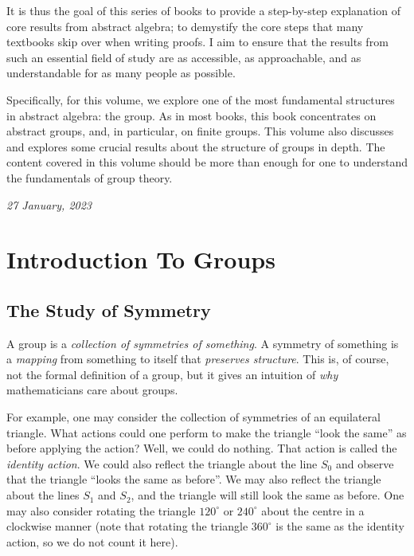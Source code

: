 It is thus the goal of this series of books to provide a step-by-step explanation of core results from abstract algebra; to demystify the core steps that many textbooks skip over when writing proofs. I aim to ensure that the results from such an essential field of study are as accessible, as approachable, and as understandable for as many people as possible.

Specifically, for this volume, we explore one of the most fundamental structures in abstract algebra: the group. As in most books, this book concentrates on abstract groups, and, in particular, on finite groups. This volume also discusses and explores some crucial results about the structure of groups in depth. The content covered in this volume should be more than enough for one to understand the fundamentals of group theory.

\hfill{\textit{27 January, 2023}}

\mainmatter  %
\chapter{Introduction To Groups}
\section{The Study of Symmetry}
A group is a \textit{collection of symmetries of something}. A symmetry of something is a \textit{mapping} from something to itself that \textit{preserves structure}. This is, of course, not the formal definition of a group, but it gives an intuition of \textit{why} mathematicians care about groups.

\begin{figure}
    \centering
\end{figure}

For example, one may consider the collection of symmetries of an equilateral triangle. What actions could one perform to make the triangle ``look the same'' as before applying the action? Well, we could do nothing. That action is called the \textit{identity action}. We could also reflect the triangle about the line $S_0$ and observe that the triangle ``looks the same as before''. We may also reflect the triangle about the lines $S_1$ and $S_2$, and the triangle will still look the same as before. One may also consider rotating the triangle $120^\circ$ or $240^\circ$ about the centre in a clockwise manner (note that rotating the triangle $360^\circ$ is the same as the identity action, so we do not count it here).

